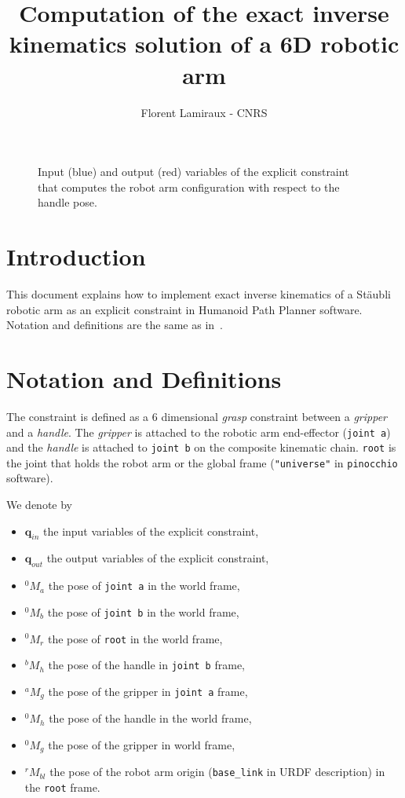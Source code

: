 \documentclass{article}
\title{Computation of the exact inverse kinematics solution of a 6D robotic arm}
\author{Florent Lamiraux - CNRS}
\newcommand\conf{\mathbf{q}}
\begin{document}
\maketitle

\begin{figure}
  \begin{center}
    \def\svgwidth {.6\linewidth}
    \graphicspath{{./figures/}}
    
  \end{center}
  \caption{Input (blue) and output (red) variables of the explicit constraint that computes the robot arm configuration with respect to the handle pose.}
  \label{fig:kinematic-chain}
\end{figure}

\section{Introduction}

This document explains how to implement exact inverse kinematics of a Stäubli robotic arm as an
explicit constraint in Humanoid Path Planner software. Notation and definitions are the same as
in~\cite{lamiraux:hal-02995125}.

\section{Notation and Definitions}

The constraint is defined as a 6 dimensional \textit{grasp} constraint between a \textit{gripper} and a
\textit{handle}. The \textit{gripper} is attached to the robotic arm end-effector (\texttt{joint a}) and the \textit{handle} is attached to \texttt{joint b} on the composite kinematic chain. \texttt{root} is the joint that holds the robot arm or the global frame (\texttt{"universe"} in \texttt{pinocchio} software).

We denote by
\begin{itemize}
\item $\conf_{in}$ the input variables of the explicit constraint,
\item $\conf_{out}$ the output variables of the explicit constraint,
\item $^0M_a$ the pose of \texttt{joint a} in the world frame,
\item $^0M_b$ the pose of \texttt{joint b} in the world frame,
\item $^0M_r$ the pose of \texttt{root} in the world frame,
\item $^bM_h$ the pose of the handle in \texttt{joint b} frame,
\item $^aM_g$ the pose of the gripper in \texttt{joint a} frame,
\item $^0M_h$ the pose of the handle in the world frame,
\item $^0M_g$ the pose of the gripper in world frame,
\item $^rM_{bl}$ the pose of the robot arm origin (\texttt{base\_link} in URDF
  description) in the \texttt{root} frame.
\end{itemize}
\end{document}
